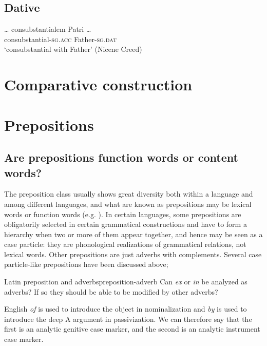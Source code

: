 \documentclass[a4paper, oneside, 12pt]{report}
\newcommand{\form}[1]{\emph{#1}}
\newcommand*{\category}[1]{\textsc{#1}}
\newcommand{\translate}[1]{`#1'}
\begin{document}
\subsection{Dative}

\begin{exe}
    \ex \gll \dots {} consubstantialem Patri \dots \\
    {} consubstantial-\category{sg.acc} Father-\category{sg.dat} \\
    \glt \translate{consubstantial with Father} (Nicene Creed)
\end{exe}

\section{Comparative construction}

\section{Prepositions}

\subsection{Are prepositions function words or content words?}\label{sec:modify.prep.grammar}

The preposition class usually shows great diversity  
both within a language and among different languages,
and what are known as prepositions may be lexical words or function words 
(e.g. \citealt{garzonio2021functional}).
In certain languages, some prepositions are obligatorily selected in certain grammatical constructions
and have to form a hierarchy when two or more of them appear together,
and hence may be seen as a case particle:
they are phonological realizations of grammatical relations, not lexical words.
Other prepositions are just adverbs with complements.
Several case particle-like prepositions have been discussed above;

\begin{todobox}{Latin preposition and adverbs}{preposition-adverb}
    Can \form{ex} or \form{in} be analyzed as adverbs?
    If so they should be able to be modified by other adverbs?
\end{todobox}

English \form{of} is used to introduce the object in nominalization 
and \form{by} is used to introduce the deep A argument in passivization.
We can therefore say that the first is an analytic genitive case marker,
and the second is an analytic instrument case marker.
\end{document}
